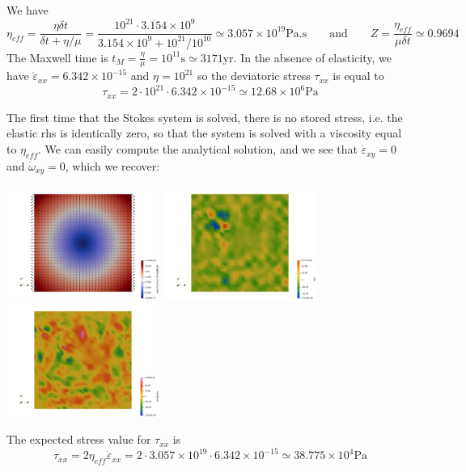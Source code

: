 We have 
\[
\eta_{eff} 
= \frac{\eta \delta t}{\delta t + \eta/\mu} 
= \frac{10^{21} \cdot 3.154\times 10^{9}}{3.154\times 10^{9} + 10^{21}/10^{10}} 
\simeq 
3.057\times 10^{19}\text{Pa.s}
\qquad
\text{and}
\qquad
Z=\frac{\eta_{eff}}{\mu \delta t} 
\simeq 
0.9694
\]
The Maxwell time is $t_M = \frac{\eta}{\mu} = 10^{11}\text{s} \simeq 3171\text{yr}$.
In the absence of elasticity, we have 
$\dot{\varepsilon}_{xx} = 6.342\times 10^{-15}$ 
and $\eta=10^{21}$ so the 
deviatoric stress $\tau_{xx}$ is equal to 
\[
\tau_{xx} = 2 \cdot 10^{21} \cdot 6.342\times 10^{-15} \simeq 12.68 \times 10^6 \text{Pa}
\]

The first time that the Stokes system is solved, there is no stored stress, i.e. the 
elastic rhs is identically zero, so that the system is solved with a viscosity equal to
$\eta_{eff}$.
We can easily compute the analytical solution, and we see that $\dot{\varepsilon}_{xy}=0$
and $\dot{\omega}_{xy}=0$, which we recover:

\begin{center}
\includegraphics[width=5cm]{python_codes/fieldstone_64/results/buildup/init/vel}
\includegraphics[width=5cm]{python_codes/fieldstone_64/results/buildup/init/exy}
\includegraphics[width=5cm]{python_codes/fieldstone_64/results/buildup/init/oxy}
\end{center}

The expected stress value for $\tau_{xx}$ is 
\[
\tau_{xx} = 2 \eta_{eff} \dot{\varepsilon}_{xx} 
= 2 \cdot 3.057\times 10^{19} \cdot 6.342\times 10^{-15} 
\simeq 38.775 \times 10^4 \text{Pa}
\]



